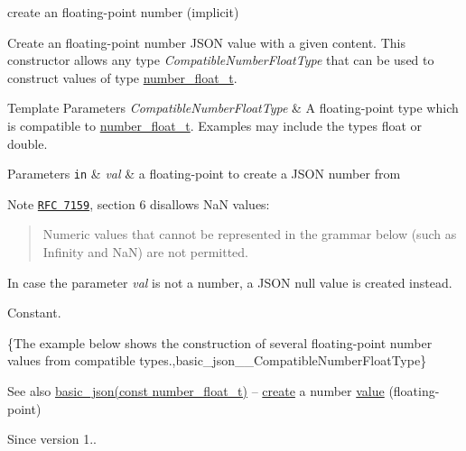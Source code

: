 create an floating-\/point number (implicit) 

Create an floating-\/point number J\+S\+ON value with a given content. This constructor allows any type {\itshape Compatible\+Number\+Float\+Type} that can be used to construct values of type \hyperlink{classnlohmann_1_1basic__json_a74a0013e847fdc574b48f931f0e757e1}{number\+\_\+float\+\_\+t}.


\begin{DoxyTemplParams}{Template Parameters}
{\em Compatible\+Number\+Float\+Type} & A floating-\/point type which is compatible to \hyperlink{classnlohmann_1_1basic__json_a74a0013e847fdc574b48f931f0e757e1}{number\+\_\+float\+\_\+t}. Examples may include the types {\ttfamily float} or {\ttfamily double}.\\
\hline
\end{DoxyTemplParams}

\begin{DoxyParams}[1]{Parameters}
\mbox{\tt in}  & {\em val} & a floating-\/point to create a J\+S\+ON number from\\
\hline
\end{DoxyParams}
\begin{DoxyNote}{Note}
\href{http://www.rfc-editor.org/rfc/rfc7159.txt}{\tt R\+FC 7159}, section 6 disallows NaN values\+: \begin{quote}
Numeric values that cannot be represented in the grammar below (such as Infinity and NaN) are not permitted. \end{quote}
In case the parameter {\itshape val} is not a number, a J\+S\+ON null value is created instead.
\end{DoxyNote}
Constant.

\{The example below shows the construction of several floating-\/point number values from compatible types.,basic\+\_\+json\+\_\+\+\_\+\+Compatible\+Number\+Float\+Type\}

\begin{DoxySeeAlso}{See also}
\hyperlink{classnlohmann_1_1basic__json_a2badcf191deabf579abcf8d3654da26f}{basic\+\_\+json(const number\+\_\+float\+\_\+t)} -- \hyperlink{classnlohmann_1_1basic__json_afdb7a485369fbfd8c4c7c134ebb1feb5}{create} a number \hyperlink{classnlohmann_1_1basic__json_a407e73a037e6e3067ef7aa2c25a79f39}{value} (floating-\/point)
\end{DoxySeeAlso}
\begin{DoxySince}{Since}
version 1.. 
\end{DoxySince}
\hypertarget{classnlohmann_1_1basic__json_afeb998aec45296bc2050bd1c41ef41eb}{}\label{classnlohmann_1_1basic__json_afeb998aec45296bc2050bd1c41ef41eb} 
